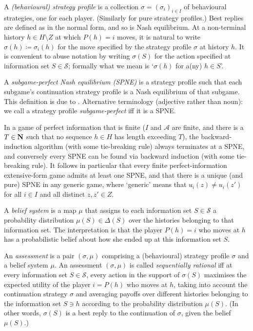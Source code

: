 \documentclass[11pt,letterpaper,reqno,oneside]{book}
\begin{document}
A \emph{(behavioural) strategy profile} is a collection $\sigma = (\sigma_i)_{i \in I}$ of behavioural strategies, one for each player. (Similarly for pure strategy profiles.) Best replies are defined as in the normal form, and so is Nash equilibrium. At a non-terminal history $h \in H \setminus Z$ at which $P(h)=i$ moves, it is natural to write $\sigma(h) \coloneqq \sigma_i(h)$ for the move specified by the strategy profile $\sigma$ at history $h$. It is convenient to abuse notation by writing $\sigma(S)$ for the action specified at information set $S \in \mathcal{S}$; formally what we mean is `$\sigma(h)$ for a(ny) $h \in S$'.

A \emph{subgame-perfect Nash equilibrium (SPNE)} is a strategy profile such that each subgame's continuation strategy profile is a Nash equilibrium of that subgame. This definition is due to \textcite{Selten1965}. Alternative terminology (adjective rather than noun): we call a strategy profile \emph{subgame-perfect} iff it is a SPNE.

In a game of perfect information that is finite ($I$ and $\mathcal{A}$ are finite, and there is a $T \in \mathbf{N}$ such that no sequence $h \in H$ has length exceeding $T$), the backward-induction algorithm (with some tie-breaking rule) always terminates at a SPNE, and conversely every SPNE can be found via backward induction (with some tie-breaking rule). It follows in particular that every finite perfect-information extensive-form game admits at least one SPNE, and that there is a unique (and pure) SPNE in any generic game, where `generic' means that $u_i(z) \neq u_i(z')$ for all $i \in I$ and all distinct $z,z' \in Z$.

A \emph{belief system} is a map $\mu$ that assigns to each information set $S \in \mathcal{S}$ a probability distribution $\mu(S) \in \Delta(S)$ over the histories belonging to that information set. The interpretation is that the player $P(h)=i$ who moves at $h$ has a probabilistic belief about how she ended up at this information set $S$.

An \emph{assessment} is a pair $(\sigma,\mu)$ comprising a (behavioural) strategy profile $\sigma$ and a belief system $\mu$. An assessment $(\sigma,\mu)$ is called \emph{sequentially rational} iff at every information set $S \in \mathcal{S}$, every action in the support of $\sigma(S)$ maximises the expected utility of the player $i = P(h)$ who moves at $h$, taking into account the continuation strategy $\sigma$ and averaging payoffs over different histories belonging to the information set $S \ni h$ according to the probability distribution $\mu(S)$. (In other words, $\sigma(S)$ is a best reply to the continuation of $\sigma$, given the belief $\mu(S)$.)
\end{document}
